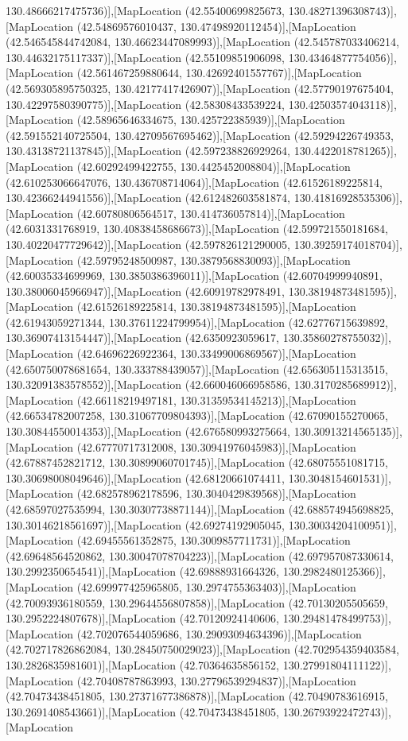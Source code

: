 130.48666217475736)],[MapLocation (42.55400699825673, 130.48271396308743)],[MapLocation (42.54869576010437, 130.47498920112454)],[MapLocation (42.546545844742084, 130.46623447089993)],[MapLocation (42.545787033406214, 130.44632175117337)],[MapLocation (42.55109851906098, 130.43464877754056)],[MapLocation (42.561467259880644, 130.42692401557767)],[MapLocation (42.569305895750325, 130.42177417426907)],[MapLocation (42.57790197675404, 130.42297580390775)],[MapLocation (42.58308433539224, 130.42503574043118)],[MapLocation (42.58965646334675, 130.425722385939)],[MapLocation (42.591552140725504, 130.42709567695462)],[MapLocation (42.59294226749353, 130.43138721137845)],[MapLocation (42.597238826929264, 130.4422018781265)],[MapLocation (42.60292499422755, 130.4425452008804)],[MapLocation (42.610253066647076, 130.436708714064)],[MapLocation (42.61526189225814, 130.42366244941556)],[MapLocation (42.612482603581874, 130.41816928535306)],[MapLocation (42.60780806564517, 130.414736057814)],[MapLocation (42.6031331768919, 130.40838458686673)],[MapLocation (42.599721550181684, 130.40220477729642)],[MapLocation (42.597826121290005, 130.39259174018704)],[MapLocation (42.59795248500987, 130.3879568830093)],[MapLocation (42.60035334699969, 130.3850386396011)],[MapLocation (42.60704999940891, 130.38006045966947)],[MapLocation (42.60919782978491, 130.38194873481595)],[MapLocation (42.61526189225814, 130.38194873481595)],[MapLocation (42.61943059271344, 130.37611224799954)],[MapLocation (42.62776715639892, 130.36907413154447)],[MapLocation (42.6350923059617, 130.35860278755032)],[MapLocation (42.64696226922364, 130.33499006869567)],[MapLocation (42.650750078681654, 130.333788439057)],[MapLocation (42.656305115313515, 130.32091383578552)],[MapLocation (42.660046066958586, 130.3170285689912)],[MapLocation (42.66118219497181, 130.31359534145213)],[MapLocation (42.66534782007258, 130.31067709804393)],[MapLocation (42.67090155270065, 130.30844550014353)],[MapLocation (42.676580993275664, 130.30913214565135)],[MapLocation (42.67770717312008, 130.30941976045983)],[MapLocation (42.67887452821712, 130.30899060701745)],[MapLocation (42.68075551081715, 130.30698008049646)],[MapLocation (42.68120661074411, 130.3048154601531)],[MapLocation (42.682578962178596, 130.3040429839568)],[MapLocation (42.68597027535994, 130.30307738871144)],[MapLocation (42.688574945698825, 130.30146218561697)],[MapLocation (42.69274192905045, 130.30034204100951)],[MapLocation (42.69455561352875, 130.3009857711731)],[MapLocation (42.69648564520862, 130.30047078704223)],[MapLocation (42.697957087330614, 130.2992350654541)],[MapLocation (42.69888931664326, 130.2982480125366)],[MapLocation (42.699977425965805, 130.2974755363403)],[MapLocation (42.70093936180559, 130.29644556807858)],[MapLocation (42.70130205505659, 130.2952224807678)],[MapLocation (42.70120924140606, 130.29481478499753)],[MapLocation (42.702076544059686, 130.29093094634396)],[MapLocation (42.702717826862084, 130.28450750029023)],[MapLocation (42.702954359403584, 130.2826835981601)],[MapLocation (42.70364635856152, 130.27991804111122)],[MapLocation (42.70408787863993, 130.27796539294837)],[MapLocation (42.70473438451805, 130.27371677386878)],[MapLocation (42.70490783616915, 130.2691408543661)],[MapLocation (42.70473438451805, 130.26793922472743)],[MapLocation 